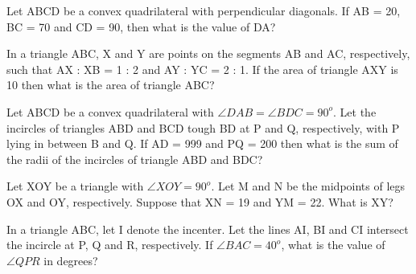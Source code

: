 \item Let ABCD be a convex quadrilateral with perpendicular diagonals. If AB = 20, BC = 70 and CD = 90, then what is the value of DA?

\item In a triangle ABC, X and Y are points on the segments AB and AC, respectively, such that AX : XB = 1 : 2 and AY : YC = 2 : 1. If the area of triangle AXY is 10 then what is the area of triangle ABC?

\item Let ABCD be a convex quadrilateral with $\angle DAB = \angle BDC = 90^{o}$. Let the incircles of triangles ABD and BCD tough BD at P and Q, respectively, with P lying in between B and Q. If AD = 999 and PQ = 200 then what is the sum of the radii of the incircles of triangle ABD and BDC?

\item Let XOY be a triangle with $\angle XOY = 90^{o}$. Let M and N be the midpoints of legs OX and OY, respectively. Suppose that XN = 19 and YM = 22. What is XY?

\item In a triangle ABC, let I denote the incenter. Let the lines AI, BI and CI intersect the incircle at P, Q and R, respectively. If $\angle BAC = 40^{o}$, what is the value of $\angle QPR$ in degrees?